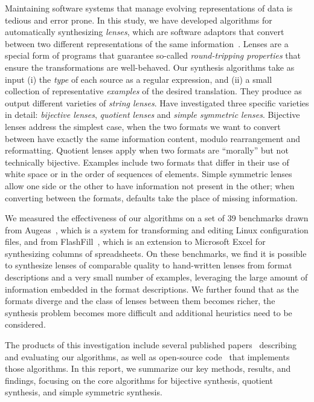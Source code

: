 \documentclass[12pt]{article}
\begin{document}
Maintaining software systems that manage evolving representations of
data is tedious and error prone.  In this study, we have developed
algorithms for automatically synthesizing \emph{lenses}, which are
software adaptors that convert between two different representations
of the same information~\cite{Focal2005}.  Lenses are a special form of
programs that 
guarantee so-called \emph{round-tripping properties} that ensure the
transformations are well-behaved.  Our synthesis algorithms take as
input (i) the \emph{type} of each source as a regular expression, and
(ii) a small collection of representative \emph{examples} of
the desired translation.  They produce as output different varieties of \emph{string
  lenses}.  Have investigated three specific varieties in detail: {\em
  bijective lenses}, {\em quotient
lenses} and {\em simple symmetric lenses}.  Bijective lenses address the
simplest case, when the two formats we want to convert between have exactly
the same information content, modulo rearrangement and reformatting.  
Quotient lenses apply when two
formats are ``morally'' but not technically bijective.  Examples include two
formats that differ in their use of white space or in the order of
sequences of elements.  Simple symmetric lenses allow one side or the other
to have 
information not present in the other; when converting between the
formats, defaults take the place of missing information. 

We measured the effectiveness of our
algorithms on a set of 39 benchmarks drawn from Augeas~\cite{augeas},
which is a system for transforming and editing Linux configuration
files, and from FlashFill~\cite{flashfill}, which is an extension to
Microsoft Excel for synthesizing columns of spreadsheets.
On these benchmarks, we find it is possible to synthesize lenses of
comparable quality to hand-written lenses from format descriptions and
a very small number of examples, leveraging 
the large amount of information embedded in the format descriptions. 
We further found that as the formats diverge and the class of lenses
between them becomes richer, the synthesis problem becomes more
difficult and additional heuristics need to be considered.

The products of this investigation include several published
papers~\cite{bijective-synthesis, quotient-synthesis, symmetric-synthesis}
describing and evaluating our algorithms, as well as open-source 
code~\cite{GitHub} that implements those algorithms.  In this report,
we summarize our key methods, results, and findings, focusing
on the core algorithms for bijective synthesis, quotient synthesis, and
simple symmetric synthesis.
\end{document}
